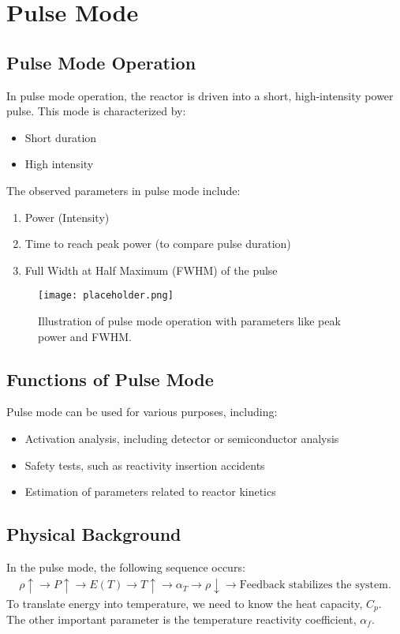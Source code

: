 \chapter{Pulse Mode}

\section{Pulse Mode Operation}
In pulse mode operation, the reactor is driven into a short, high-intensity power pulse. This mode is characterized by:
\begin{itemize}
    \item Short duration
    \item High intensity
\end{itemize}
The observed parameters in pulse mode include:
\begin{enumerate}
    \item Power (Intensity)
    \item Time to reach peak power (to compare pulse duration)
    \item Full Width at Half Maximum (FWHM) of the pulse
\end{enumerate}

\begin{figure}[H]
    \centering
    \texttt{[image: placeholder.png]}
    \caption{Illustration of pulse mode operation with parameters like peak power and FWHM.}
    \label{fig:pulse_mode}
\end{figure}

\section{Functions of Pulse Mode}
Pulse mode can be used for various purposes, including:
\begin{itemize}
    \item Activation analysis, including detector or semiconductor analysis
    \item Safety tests, such as reactivity insertion accidents
    \item Estimation of parameters related to reactor kinetics
\end{itemize}

\section{Physical Background}
In the pulse mode, the following sequence occurs:
\begin{align*}
    \rho \uparrow \to P \uparrow \to E(T) \to T \uparrow \to \alpha_T \to \rho \downarrow \to \text{Feedback stabilizes the system.}
\end{align*}
To translate energy into temperature, we need to know the heat capacity, $C_p$. The other important parameter is the temperature reactivity coefficient, $\alpha_f$.

